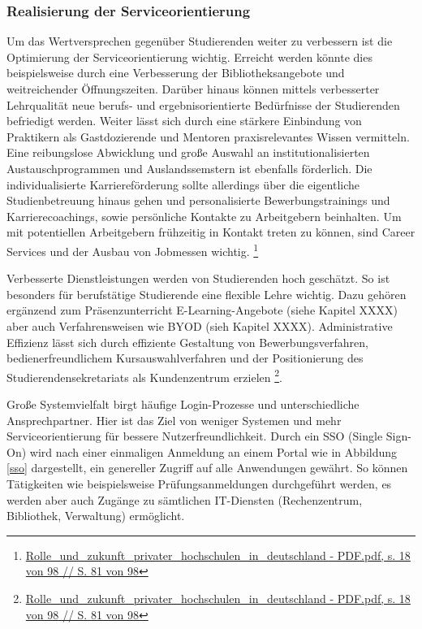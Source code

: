 \documentclass[a4paper, 12pt]{scrreprt}
\begin{document}
\subsubsection{Realisierung der Serviceorientierung}
Um das Wertversprechen gegenüber Studierenden weiter zu verbessern ist die Optimierung der Serviceorientierung wichtig. Erreicht werden könnte dies beispielsweise durch eine Verbesserung der Bibliotheksangebote und weitreichender Öffnungszeiten. Darüber hinaus können mittels verbesserter Lehrqualität neue berufs- und ergebnisorientierte Bedürfnisse der Studierenden befriedigt werden. Weiter lässt sich durch eine stärkere Einbindung von Praktikern als Gastdozierende und Mentoren praxisrelevantes Wissen vermitteln. Eine reibungslose Abwicklung und große Auswahl an institutionalisierten Austauschprogrammen und Auslandssemstern ist ebenfalls förderlich. Die individualisierte Karriereförderung sollte allerdings über die eigentliche Studienbetreuung hinaus gehen und personalisierte Bewerbungstrainings und Karrierecoachings, sowie persönliche Kontakte zu Arbeitgebern beinhalten. Um mit potentiellen Arbeitgebern frühzeitig in Kontakt treten zu können, sind Career Services und der Ausbau von Jobmessen wichtig. \footnote{\url{Rolle_und_zukunft_privater_hochschulen_in_deutschland - PDF.pdf, s. 18 von 98 // S. 81 von 98}}

Verbesserte Dienstleistungen werden von Studierenden hoch geschätzt.	So ist besonders für berufstätige Studierende eine flexible Lehre wichtig. Dazu gehören ergänzend zum Präsenzunterricht E-Learning-Angebote (siehe Kapitel XXXX) aber auch Verfahrensweisen wie BYOD (sieh Kapitel XXXX). Administrative Effizienz lässt sich durch effiziente Gestaltung von Bewerbungsverfahren, bedienerfreundlichem Kursauswahlverfahren und der Positionierung des Studierendensekretariats als Kundenzentrum erzielen \footnote{\url{Rolle_und_zukunft_privater_hochschulen_in_deutschland - PDF.pdf, s. 18 von 98 // S. 81 von 98}}.

Große Systemvielfalt birgt häufige Login-Prozesse und unterschiedliche Ansprechpartner. Hier ist das Ziel von weniger Systemen und mehr Serviceorientierung für bessere Nutzerfreundlichkeit. Durch ein SSO (Single Sign-On) wird nach einer einmaligen Anmeldung an einem Portal wie in Abbildung \ref{sso} dargestellt, ein genereller Zugriff auf alle Anwendungen gewährt. So können Tätigkeiten wie beispielsweise Prüfungsanmeldungen durchgeführt werden, es werden aber auch Zugänge zu sämtlichen IT-Diensten (Rechenzentrum, Bibliothek, Verwaltung) ermöglicht.
\end{document}
